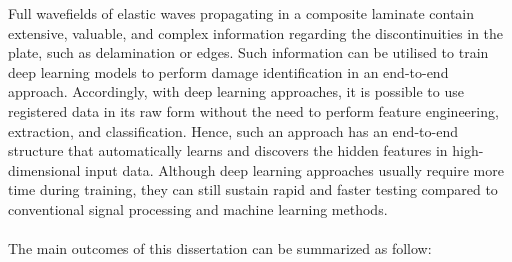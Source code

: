Full wavefields of elastic waves propagating in a composite laminate contain extensive, valuable, and complex information regarding the discontinuities in the plate, such as delamination or edges.
Such information can be utilised to train deep learning models to perform damage identification in an end-to-end approach.
Accordingly, with deep learning approaches, it is possible to use registered data in its raw form without the need to perform feature engineering, extraction, and classification.
Hence, such an approach has an end-to-end structure that automatically learns and discovers the hidden features in high-dimensional input data.
Although deep learning approaches usually require more time during training, they can still sustain rapid and faster testing compared to conventional signal processing and machine learning methods.
\\  \\
The main outcomes of this dissertation can be summarized as follow:
